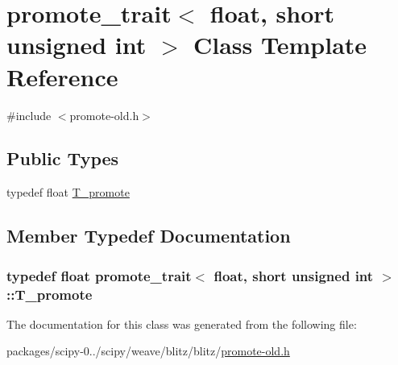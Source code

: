 \hypertarget{classpromote__trait_3_01float_00_01short_01unsigned_01int_01_4}{}\section{promote\+\_\+trait$<$ float, short unsigned int $>$ Class Template Reference}
\label{classpromote__trait_3_01float_00_01short_01unsigned_01int_01_4}


{\ttfamily \#include $<$promote-\/old.\+h$>$}

\subsection*{Public Types}
\begin{DoxyCompactItemize}
\item 
typedef float \hyperlink{classpromote__trait_3_01float_00_01short_01unsigned_01int_01_4_ac6938d039ea4daa5ef3c1131c40887f7}{T\+\_\+promote}
\end{DoxyCompactItemize}


\subsection{Member Typedef Documentation}
\hypertarget{classpromote__trait_3_01float_00_01short_01unsigned_01int_01_4_ac6938d039ea4daa5ef3c1131c40887f7}{}
\subsubsection[{T\+\_\+promote}]{\setlength{\rightskip}{0pt plus 5cm}typedef float {\bf promote\+\_\+trait}$<$ float, short unsigned int $>$\+::{\bf T\+\_\+promote}}\label{classpromote__trait_3_01float_00_01short_01unsigned_01int_01_4_ac6938d039ea4daa5ef3c1131c40887f7}


The documentation for this class was generated from the following file\+:\begin{DoxyCompactItemize}
\item 
packages/scipy-\/0../scipy/weave/blitz/blitz/\hyperlink{promote-old_8h}{promote-\/old.\+h}\end{DoxyCompactItemize}
